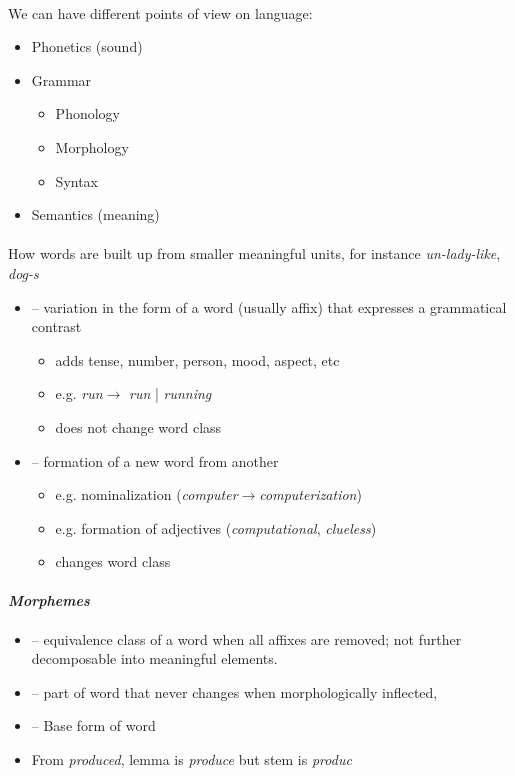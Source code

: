 \documentclass[10pt,twocolumn]{article}
\begin{document}
\paragraph{} We can have different points of view on
language:
\begin{itemize}
\item Phonetics (sound)
\item Grammar
\begin{itemize}
\item Phonology
\item Morphology
\item Syntax
\end{itemize}
\item Semantics (meaning)
\end{itemize}

\paragraph{} How words are built up from smaller meaningful
units, for instance \textit{un-lady-like}, \textit{dog-s}
\begin{itemize}
\item \textbf{} -- variation in the form of a word (usually affix)
  that expresses a grammatical contrast
  \begin{itemize}
  \item adds tense, number, person, mood, aspect, etc
  \item e.g. \textit{run}$\rightarrow$ \textit{run} | \textit{running} 
  \item does not change word class
  \end{itemize}
\item \textbf{} -- formation of a new word from another
  \begin{itemize}
  \item e.g. nominalization (\textit{computer}$\rightarrow$\textit{computerization})
  \item e.g. formation of adjectives (\textit{computational}, \textit{clueless})
  \item changes word class
  \end{itemize}
\end{itemize}

\paragraph{\textit{Morphemes}}
\begin{itemize}
\item \textbf{} -- equivalence class of a word when all affixes are
  removed; not further decomposable into meaningful elements.
\item \textbf{} -- part of word that never changes when
  morphologically inflected, 
\item \textbf{} -- Base form of word
\item From \textit{produced}, lemma is \textit{produce} but stem is \textit{produc}
\end{itemize}
\end{document}
